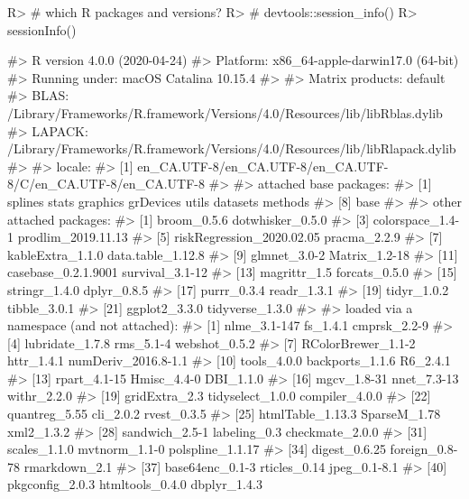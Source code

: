 \documentclass[
]{jss}
\begin{document}
\begin{CodeChunk}

\begin{CodeInput}
R> # which R packages and versions?
R> # devtools::session_info()
R> sessionInfo()
\end{CodeInput}

\begin{CodeOutput}
#> R version 4.0.0 (2020-04-24)
#> Platform: x86_64-apple-darwin17.0 (64-bit)
#> Running under: macOS Catalina 10.15.4
#> 
#> Matrix products: default
#> BLAS:   /Library/Frameworks/R.framework/Versions/4.0/Resources/lib/libRblas.dylib
#> LAPACK: /Library/Frameworks/R.framework/Versions/4.0/Resources/lib/libRlapack.dylib
#> 
#> locale:
#> [1] en_CA.UTF-8/en_CA.UTF-8/en_CA.UTF-8/C/en_CA.UTF-8/en_CA.UTF-8
#> 
#> attached base packages:
#> [1] splines   stats     graphics  grDevices utils     datasets  methods  
#> [8] base     
#> 
#> other attached packages:
#>  [1] broom_0.5.6               dotwhisker_0.5.0         
#>  [3] colorspace_1.4-1          prodlim_2019.11.13       
#>  [5] riskRegression_2020.02.05 pracma_2.2.9             
#>  [7] kableExtra_1.1.0          data.table_1.12.8        
#>  [9] glmnet_3.0-2              Matrix_1.2-18            
#> [11] casebase_0.2.1.9001       survival_3.1-12          
#> [13] magrittr_1.5              forcats_0.5.0            
#> [15] stringr_1.4.0             dplyr_0.8.5              
#> [17] purrr_0.3.4               readr_1.3.1              
#> [19] tidyr_1.0.2               tibble_3.0.1             
#> [21] ggplot2_3.3.0             tidyverse_1.3.0          
#> 
#> loaded via a namespace (and not attached):
#>  [1] nlme_3.1-147        fs_1.4.1            cmprsk_2.2-9       
#>  [4] lubridate_1.7.8     rms_5.1-4           webshot_0.5.2      
#>  [7] RColorBrewer_1.1-2  httr_1.4.1          numDeriv_2016.8-1.1
#> [10] tools_4.0.0         backports_1.1.6     R6_2.4.1           
#> [13] rpart_4.1-15        Hmisc_4.4-0         DBI_1.1.0          
#> [16] mgcv_1.8-31         nnet_7.3-13         withr_2.2.0        
#> [19] gridExtra_2.3       tidyselect_1.0.0    compiler_4.0.0     
#> [22] quantreg_5.55       cli_2.0.2           rvest_0.3.5        
#> [25] htmlTable_1.13.3    SparseM_1.78        xml2_1.3.2         
#> [28] sandwich_2.5-1      labeling_0.3        checkmate_2.0.0    
#> [31] scales_1.1.0        mvtnorm_1.1-0       polspline_1.1.17   
#> [34] digest_0.6.25       foreign_0.8-78      rmarkdown_2.1      
#> [37] base64enc_0.1-3     rticles_0.14        jpeg_0.1-8.1       
#> [40] pkgconfig_2.0.3     htmltools_0.4.0     dbplyr_1.4.3       

\end{CodeOutput}
\end{CodeChunk}
\end{document}
